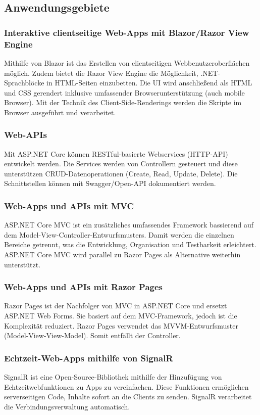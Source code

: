 \subsection{Anwendungsgebiete}

\subsubsection{Interaktive clientseitige Web-Apps mit Blazor/Razor View Engine}
Mithilfe von Blazor ist das Erstellen von clientseitigen Webbenutzeroberflächen möglich.
Zudem bietet die Razor View Engine die Möglichkeit, .NET-Sprachblöcke in HTML-Seiten einzubetten.
Die UI wird anschließend als HTML und CSS gerendert inklusive umfassender Browserunterstützung (auch mobile Browser).
Mit der Technik des Client-Side-Renderings werden die Skripte im Browser ausgeführt und verarbeitet.

\subsubsection{Web-APIs}
Mit ASP.NET Core können RESTful-basierte Webservices (HTTP-API) entwickelt werden. Die Services werden von Controllern gesteuert und diese 
unterstützen CRUD-Datenoperationen (Create, Read, Update, Delete).
Die Schnittstellen können mit Swagger/Open-API dokumentiert werden.

\subsubsection{Web-Apps und APIs mit MVC}
ASP.NET Core MVC ist ein zusätzliches umfassendes Framework bassierend auf dem Model-View-Controller-Entwurfsmusters. Damit werden 
die einzelnen Bereiche getrennt, was die Entwicklung, Organisation und Testbarkeit erleichtert. 
ASP.NET Core MVC wird parallel zu Razor Pages als Alternative weiterhin unterstützt.

\subsubsection{Web-Apps und APIs mit Razor Pages}
Razor Pages ist der Nachfolger von MVC in ASP.NET Core und ersetzt ASP.NET Web Forms. 
Sie basiert auf dem MVC-Framework, jedoch ist die Komplexität reduziert. Razor Pages verwendet das 
MVVM-Entwurfsmuster (Model-View-View-Model). Somit entfällt der Controller.


\subsubsection{Echtzeit-Web-Apps mithilfe von SignalR}
SignalR ist eine Open-Source-Bibliothek mithilfe der Hinzufügung von Echtzeitwebfunktionen zu Apps zu vereinfachen.
Diese Funktionen ermöglichen serverseitigen Code, Inhalte sofort an die Clients zu senden. SignalR verarbeitet die Verbindungsverwaltung 
automatisch.


